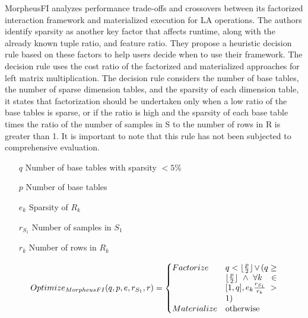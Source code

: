 MorpheusFI \cite{MorpheusFI} analyzes performance trade-offs and crossovers between its factorized interaction framework and materialized execution for LA operations. The authors identify sparsity as another key factor that affects runtime, along with the already known tuple ratio, and feature ratio. They propose a heuristic decision rule based on these factors to help users decide when to use their framework. The decision rule uses the cost ratio of the factorized and materialized approaches for left matrix multiplication. The decision rule considers the number of base tables, the number of sparse dimension tables, and the sparsity of each dimension table, it states that factorization should be undertaken only when a low ratio of the base tables is sparse, or if the ratio is high and the sparsity of each base table times the ratio of the number of samples in S to the number of rows in R is greater than 1.  It is important to note that this rule has not been subjected to comprehensive evaluation.

\begin{definition}
    \begin{itemize}
        \item[]
            \item[$q$]Number of base tables with sparsity $ < 5\% $
        \item[$p$] Number of base tables
        \item[$e_k$] Sparsity of $R_k$
        \item[$r_{S_1}$] Number of samples in $S_1$
        \item[$r_k$] Number of rows in $R_k$
    \end{itemize}

    \begin{align*}
        \begin{split}
            Optimize_{MorpheusFI}(q, p, e, r_{S_1}, r) =
            \begin{cases}
                Factorize   & \parbox[t]{.18\linewidth}{$q < \lfloor \frac{p}{2} \rfloor \vee ( q \geq \lfloor \frac{p}{2} \rfloor \wedge \forall k \in [1,q], e_k \frac{r_{S_1}}{r_k} > 1)$} \\
                Materialize & \text{otherwise}
            \end{cases}
        \end{split}
    \end{align*}
\end{definition}

